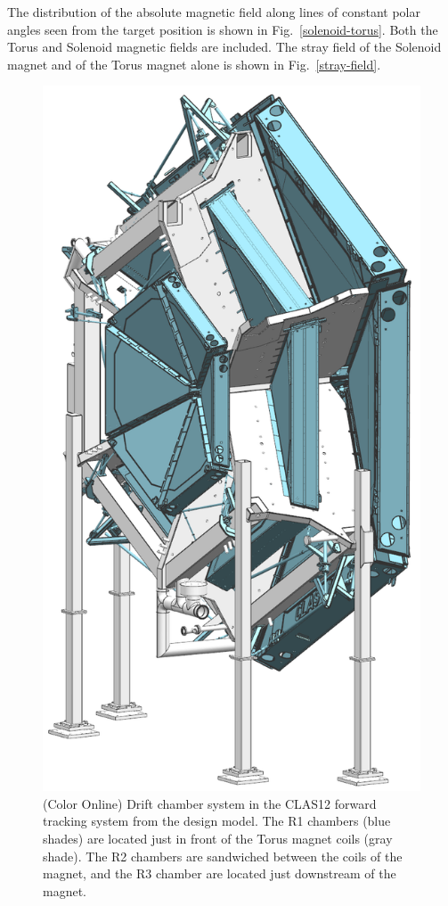 \documentclass[final,3p,twocolumn]{elsarticle}
\begin{document}
The distribution of the absolute magnetic field along lines of constant polar angles seen from the target position is shown
in Fig.~\ref{solenoid-torus}. Both the Torus and Solenoid magnetic fields are included. The stray field of the Solenoid
magnet and of the Torus magnet alone is shown in Fig.~\ref{stray-field}.  




\begin{figure}[ht]
\centerline{\includegraphics[width=0.60\columnwidth]{dc-view-4.png}}
\caption{(Color Online) Drift chamber system in the CLAS12 forward tracking system from the design model. 
The R1 chambers (blue shades) are located just in front of the Torus magnet coils (gray shade). 
The R2 chambers are sandwiched between the coils 
of the magnet, and the R3 chamber are located just downstream of the magnet.}
\label{clas12-dc}
\end{figure}
\end{document}
